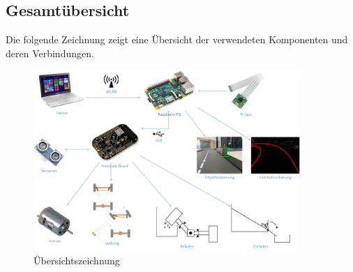 \subsection{Gesamtübersicht}
Die folgende Zeichnung zeigt eine Übersicht der verwendeten Komponenten und deren Verbindungen.
\begin{figure}[H]%
\centering
\includegraphics[width=0.9\textwidth]{03_Loesungskonzept/pictures/uebersichtszeichnung.png}
\caption{Übersichtszeichnung}
\label{fig:Übersichtszeichnung}
\end{figure}

